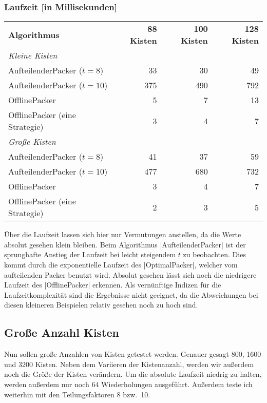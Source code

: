 \subsubsection*{Laufzeit [in Millisekunden]}
\begin{center}
\begin{tabular}{lrrr}
\vspace*{.42em}
\textbf{Algorithmus} 	& \textbf{88 Kisten} 	& \textbf{100 Kisten} 	& \textbf{128 Kisten} 	\\
\textit{Kleine Kisten} & & & \\
 AufteilenderPacker ($t=8$)  	& 33		& 30			& 49			\\
 AufteilenderPacker ($t=10$)  	& 375		& 490			& 792			\\
 OfflinePacker			& 5		& 7			& 13			\\
\vspace*{.42em}
 OfflinePacker (eine Strategie)	& 3		& 4			& 7			\\
\textit{Große Kisten} & & & \\
 AufteilenderPacker ($t=8$)  	& 41		& 37			& 59			\\
 AufteilenderPacker ($t=10$)	& 477		& 680			& 732			\\
 OfflinePacker			& 3		& 4			& 7			\\
 OfflinePacker (eine Strategie)	& 2		& 3			& 5			\\
\end{tabular}
\end{center}
 Über die Laufzeit lassen sich hier nur Vermutungen anstellen, da die Werte absolut gesehen klein bleiben.
 Beim Algorithmus |AufteilenderPacker| ist der sprunghafte Anstieg der Laufzeit bei leicht steigendem $t$ zu beobachten.
 Dies kommt durch die exponentielle Laufzeit des |OptimalPacker|, welcher vom aufteilenden Packer benutzt wird.
 Absolut gesehen lässt sich noch die niedrigere Laufzeit des |OfflinePacker| erkennen.
 Als vernünftige Indizen für die Laufzeitkomplexität sind die Ergebnisse nicht geeignet,
  da die Abweichungen bei diesen kleineren Beispielen relativ gesehen noch zu hoch sind.

\subsection{Große Anzahl Kisten}
 Nun sollen große Anzahlen von Kisten getestet werden. Genauer gesagt 800, 1600 und 3200 Kisten.
 Neben dem Variieren der Kistenanzahl, werden wir außerdem noch die Größe der Kisten verändern.
 Um die absolute Laufzeit niedrig zu halten, werden außerdem nur noch 64 Wiederholungen ausgeführt.
 Außerdem teste ich weiterhin mit den Teilungsfaktoren 8 bzw.\ 10.

